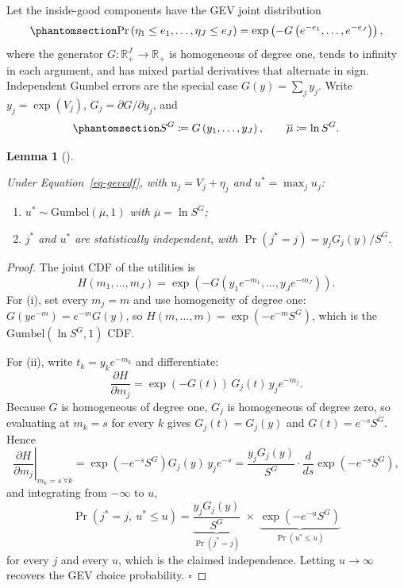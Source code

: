 \documentclass[
  letterpaper,
  DIV=11,
  numbers=noendperiod]{scrartcl}
\theoremstyle{plain}
\newtheorem{lemma}{Lemma}[section]
\theoremstyle{plain}
\theoremstyle{plain}
\theoremstyle{remark}
\begin{document}
Let the inside-good components have the GEV joint distribution
\begin{equation}\protect\phantomsection\label{eq-gevcdf}{
\Pr \left( \eta_1 \le e_1, \ldots, \eta_J \le e_J \right)
= \exp \left( - G \left( e^{-e_1}, \ldots, e^{-e_J} \right) \right),
}\end{equation} where the generator
\(G : \mathbb{R}^J_{+} \to \mathbb{R}_{+}\) is homogeneous of degree
one, tends to infinity in each argument, and has mixed partial
derivatives that alternate in sign. Independent Gumbel errors are the
special case \(G(y) = \sum_j y_j\). Write \(y_j = \exp(V_j)\),
\(G_j = \partial G / \partial y_j\), and
\begin{equation}\protect\phantomsection\label{eq-gevmu}{
S^{G} \coloneqq G \left( y_1, \ldots, y_J \right),
\qquad
\overline{\mu} \coloneqq \ln S^{G}.
}\end{equation}

\begin{lemma}[]\protect\hypertarget{lem-gev}{}\label{lem-gev}

Under Equation~\ref{eq-gevcdf}, with \(u_j = V_j + \eta_j\) and
\(u^* = \max_{j} u_j\):

\begin{enumerate}
\def\labelenumi{(\roman{enumi})}
\item
  \(u^* \sim \text{Gumbel} \left( \overline{\mu}, 1 \right)\) with
  \(\overline{\mu} = \ln S^{G}\);
\item
  \(j^*\) and \(u^*\) are statistically independent, with
  \(\Pr(j^* = j) = y_j G_j(y) / S^{G}\).
\end{enumerate}

\end{lemma}

\begin{proof}
The joint CDF of the utilities is \[
H \left( m_1, \ldots, m_J \right)
= \exp \left( - G \left( y_1 e^{-m_1}, \ldots, y_J e^{-m_J} \right) \right).
\] For (i), set every \(m_j = m\) and use homogeneity of degree one:
\(G(y e^{-m}) = e^{-m} G(y)\), so
\(H(m, \ldots, m) = \exp \left( - e^{-m} S^{G} \right)\), which is the
\(\text{Gumbel}\left(\ln S^{G}, 1\right)\) CDF.

For (ii), write \(t_k = y_k e^{-m_k}\) and differentiate: \[
\frac{\partial H}{\partial m_j}
= \exp \left( -G(t) \right) \, G_j(t) \, y_j e^{-m_j}.
\] Because \(G\) is homogeneous of degree one, \(G_j\) is homogeneous of
degree zero, so evaluating at \(m_k = s\) for every \(k\) gives
\(G_j(t) = G_j(y)\) and \(G(t) = e^{-s} S^{G}\). Hence \[
\left. \frac{\partial H}{\partial m_j} \right|_{m_k = s \ \forall k}
= \exp \left( - e^{-s} S^{G} \right) G_j(y) \, y_j e^{-s}
= \frac{y_j G_j(y)}{S^{G}} \cdot \frac{d}{ds} \exp \left( - e^{-s} S^{G} \right),
\] and integrating from \(-\infty\) to \(u\), \[
\Pr \left( j^* = j, \ u^* \le u \right)
= \underbrace{\frac{y_j G_j(y)}{S^{G}}}_{\Pr \left( j^* = j \right)}
\; \times \;
\underbrace{\exp \left( - e^{-u} S^{G} \right)}_{\Pr \left( u^* \le u \right)}
\] for every \(j\) and every \(u\), which is the claimed independence.
Letting \(u \to \infty\) recovers the GEV choice probability.
\(\square\)
\end{proof}
\end{document}
